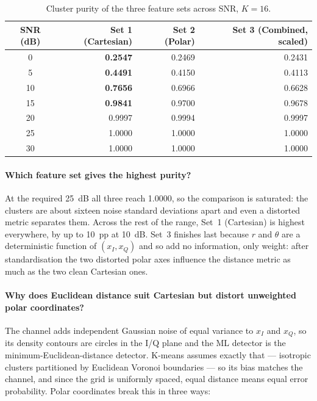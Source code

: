 \documentclass[11pt,a4paper]{article}
\begin{document}
\begin{table}[H]
\centering
\caption{Cluster purity of the three feature sets across SNR, $K = 16$.}
\label{tab:purityall}
\begin{tabular}{crrr}
\toprule
SNR (dB) & Set 1 (Cartesian) & Set 2 (Polar) & Set 3 (Combined, scaled) \\
\midrule
 0 & \textbf{0.2547} & 0.2469 & 0.2431 \\
 5 & \textbf{0.4491} & 0.4150 & 0.4113 \\
10 & \textbf{0.7656} & 0.6966 & 0.6628 \\
15 & \textbf{0.9841} & 0.9700 & 0.9678 \\
20 & 0.9997 & 0.9994 & 0.9997 \\
25 & 1.0000 & 1.0000 & 1.0000 \\
30 & 1.0000 & 1.0000 & 1.0000 \\
\bottomrule
\end{tabular}
\end{table}

\paragraph{Which feature set gives the highest purity?}
At the required 25~dB all three reach 1.0000, so the comparison is saturated: the clusters are
about sixteen noise standard deviations apart and even a distorted metric separates them.
Across the rest of the range, Set~1 (Cartesian) is highest everywhere, by up to 10~pp at 10~dB.
Set~3 finishes last because $r$ and $\theta$ are a deterministic function of $(x_I,x_Q)$ and so
add no information, only weight: after standardisation the two distorted polar axes influence
the distance metric as much as the two clean Cartesian ones.

\paragraph{Why does Euclidean distance suit Cartesian but distort unweighted polar
coordinates?}
The channel adds independent Gaussian noise of equal variance to $x_I$ and $x_Q$, so its
density contours are circles in the I/Q plane and the ML detector is the
minimum-Euclidean-distance detector. K-means assumes exactly that --- isotropic clusters
partitioned by Euclidean Voronoi boundaries --- so its bias matches the channel, and since the
grid is uniformly spaced, equal distance means equal error probability. Polar coordinates break
this in three ways:
\end{document}

